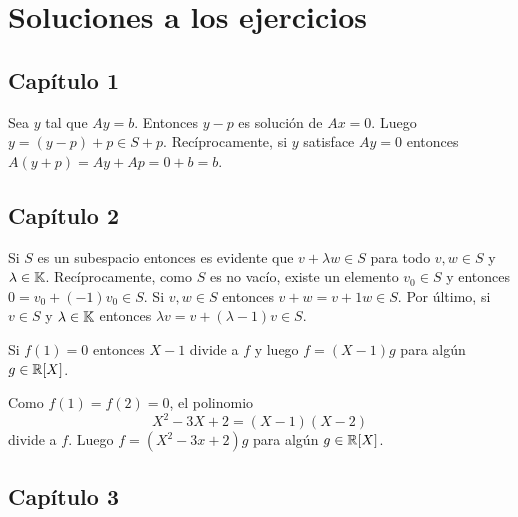 \chapter{Soluciones a los ejercicios}

\section{Capítulo 1}

\begin{solution}[ejercicio~\ref{xca:Ax=b_y_Ax=0}]
	Sea $y$ tal que $Ay=b$. Entonces $y-p$ es solución de $Ax=0$. Luego
	$y=(y-p)+p\in S+p$. Recíprocamente, si $y$ satisface $Ay=0$ entonces
	$A(y+p)=Ay+Ap=0+b=b$.
\end{solution}

\begin{solution}[ejercicio~\ref{xca:I^T=I}]
\end{solution}
 
\section{Capítulo 2}

\begin{solution}
    Si $S$ es un subespacio entonces es evidente que $v+\lambda w\in S$ para
    todo $v,w\in S$ y $\lambda\in\mathbb{K}$. Recíprocamente, como $S$ es no vacío,
    existe un elemento $v_0\in S$ y entonces $0=v_0+(-1)v_0\in S$. Si $v,w\in
    S$ entonces $v+w=v+1w\in S$. Por último, si $v\in S$ y $\lambda\in\mathbb{K}$
    entonces $\lambda v=v+(\lambda-1)v\in S$.
\end{solution}

\begin{solution}[ejercicio~\ref{xca:f(1)=0}]
	Si $f(1)=0$ entonces
	$X-1$ divide a $f$ y luego $f=(X-1)g$ para algún $g\in\mathbb{R}[X]$. 
\end{solution}
 
\begin{solution}
	Como $f(1)=f(2)=0$, el polinomio 
    \[
        X^2-3X+2=(X-1)(X-2)
    \]
    divide a $f$. Luego 
	$f=(X^2-3x+2)g$ para algún $g\in\mathbb{R}[X]$.
\end{solution}

\begin{solution}
		
\end{solution}

\section{Capítulo 3}

